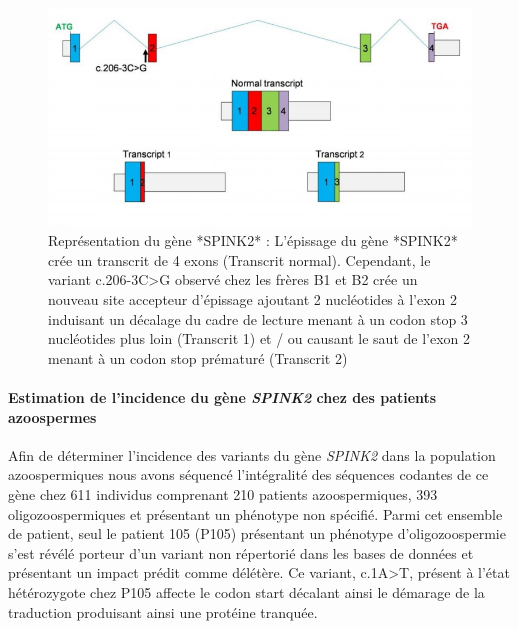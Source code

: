 \documentclass[12pt,twoside]{reedthesis}
\theoremstyle{definition}
\theoremstyle{definition}
\theoremstyle{remark}
\begin{document}
  \begin{figure}
  
  {\centering \includegraphics[scale=0.42]{figure/spink2_transcripts} 
  
  }
  
  \caption[Représentation du gène *SPINK2*]{Représentation du gène *SPINK2* : L'épissage du gène *SPINK2* crée un transcrit de 4 exons (Transcrit normal). Cependant, le variant c.206-3C>G observé chez les frères B1 et B2 crée un nouveau site accepteur d'épissage ajoutant 2 nucléotides à l'exon 2 induisant un décalage du cadre de lecture menant à un codon stop 3 nucléotides plus loin (Transcrit 1) et / ou causant le saut de l'exon 2 menant à un codon stop prématuré (Transcrit 2)}\label{fig:spink2trans}
  \end{figure}
  
  \paragraph{\texorpdfstring{Estimation de l'incidence du gène
  \emph{SPINK2} chez des patients
  azoospermes}{Estimation de l'incidence du gène SPINK2 chez des patients azoospermes}}\label{estimation-de-lincidence-du-gene-spink2-chez-des-patients-azoospermes}
  
  Afin de déterminer l'incidence des variants du gène \emph{SPINK2} dans
  la population azoospermiques nous avons séquencé l'intégralité des
  séquences codantes de ce gène chez 611 individus comprenant 210 patients
  azoospermiques, 393 oligozoospermiques et présentant un phénotype non
  spécifié. Parmi cet ensemble de patient, seul le patient 105 (P105)
  présentant un phénotype d'oligozoospermie s'est révélé porteur d'un
  variant non répertorié dans les bases de données et présentant un impact
  prédit comme délétère. Ce variant, c.1A\textgreater{}T, présent à l'état
  hétérozygote chez P105 affecte le codon start décalant ainsi le démarage
  de la traduction produisant ainsi une protéine tranquée.
  
\end{document}

